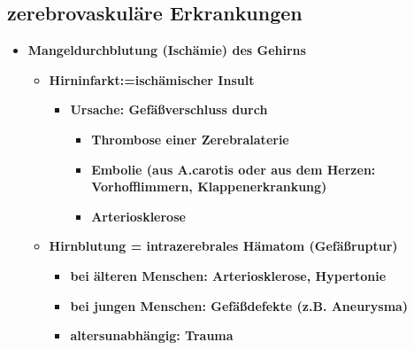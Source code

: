 	\subsection{zerebrovaskuläre Erkrankungen}
		\begin{itemize}
			\item \textbf{Mangeldurchblutung (Ischämie) des Gehirns}
				\begin{itemize}
					\item \textbf{Hirninfarkt:=ischämischer Insult}
						\begin{itemize}
							\item \textbf{Ursache: Gefäßverschluss durch}
								\begin{itemize}
									\item \textbf{Thrombose einer Zerebralaterie}
									\item \textbf{Embolie (aus A.carotis oder aus dem Herzen: Vorhofflimmern, Klappenerkrankung)}
									\item \textbf{Arteriosklerose}
								\end{itemize}
						\end{itemize}
					\item \textbf{Hirnblutung = intrazerebrales Hämatom (Gefäßruptur)}
						\begin{itemize}
							\item \textbf{bei älteren Menschen: Arteriosklerose, Hypertonie}
							\item \textbf{bei jungen Menschen: Gefäßdefekte (z.B. Aneurysma)}
							\item \textbf{altersunabhängig: Trauma}
						\end{itemize}
				\end{itemize}
		\end{itemize}
